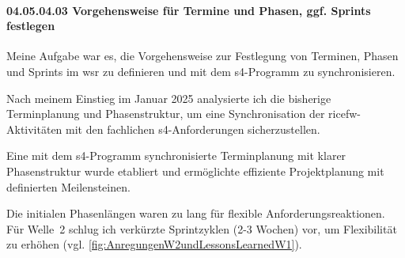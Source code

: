 \paragraph*{04.05.04.03 Vorgehensweise für Termine und Phasen, ggf. Sprints festlegen}
\label{para:04.05.04.03_VorgehensweiseFuerTermineUndPhasenUndSprints}

\par Meine Aufgabe war es, die Vorgehensweise zur Festlegung von Terminen, Phasen und Sprints im \gls{wsr} zu definieren und mit dem \gls{s4}-Programm zu synchronisieren.

\par Nach meinem Einstieg im Januar 2025 analysierte ich die bisherige Terminplanung und Phasenstruktur, um eine Synchronisation der \gls{ricefw}-Aktivitäten mit den fachlichen \gls{s4}-Anforderungen sicherzustellen.

\par Eine mit dem \gls{s4}-Programm synchronisierte Terminplanung mit klarer Phasenstruktur wurde etabliert und ermöglichte effiziente Projektplanung mit definierten Meilensteinen.

\par Die initialen Phasenlängen waren zu lang für flexible Anforderungsreaktionen. Für Welle~2 schlug ich verkürzte Sprintzyklen (2-3 Wochen) vor, um Flexibilität zu erhöhen (vgl. \autoref{fig:AnregungenW2undLessonsLearnedW1}).